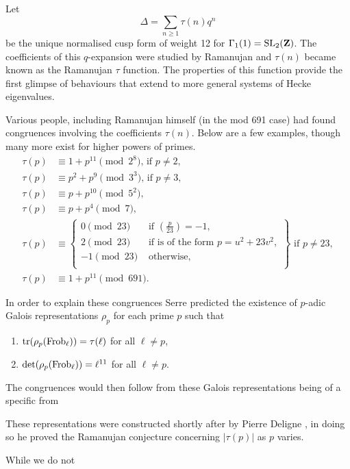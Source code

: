 \documentclass[a4paper,12pt]{article}
\begin{document}
\begin{ex}\label{ex:delt}
Let
\[
\Delta = \sum_{n \ge 1} \tau(n) q^n
\]
be the unique normalised cusp form of weight 12 for $\Gamma_1(1) = \operatorname{SL}_2(\mathbf{Z})$.
The coefficients of this $q$-expansion were studied by Ramanujan and $\tau(n)$ became known as the Ramanujan $\tau$ function.
The properties of this function provide the first glimpse of behaviours that extend to more general systems of Hecke eigenvalues.

Various people, including Ramanujan himself (in the mod 691 case) had found congruences involving the coefficients $\tau(n)$.
Below are a few examples, though many more exist for higher powers of primes.
\begin{align}\label{eq:taucong}
\tau(p) &\equiv 1 + p^{11} \pmod{2^8}\text{, if } p \ne 2,\\
\tau(p) &\equiv p^2 + p^9 \pmod{3^3}\text{, if } p \ne 3,\\
\tau(p) &\equiv p + p^{10} \pmod{5^2},\\
\tau(p) &\equiv p + p^4 \pmod{7},\\
\tau(p) &\equiv\left.\begin{cases}
0\pmod{23} & \text{ if } \left(\frac{p}{23}\right) = -1,\\
2\pmod{23} & \text{ if is of the form } p = u^2 + 23v^2,\\
-1\pmod{23} & \text{ otherwise},\\
\end{cases}\right\}\text{ if } p \ne 23,\\
\tau(p) &\equiv 1 + p^{11} \pmod{691}.
\end{align}

In order to explain these congruences Serre predicted \cite{Serre67} the existence of $p$-adic Galois representations $\rho_p$ for each prime $p$ such that
\begin{enumerate}
\item $\operatorname{tr}(\rho_p (\operatorname{Frob}_\ell)) = \tau(\ell)$ for all $\ell \ne p$,
\item $\det(\rho_p (\operatorname{Frob}_\ell)) = \ell^{11}$ for all $\ell \ne p$.
\end{enumerate}

The congruences would then follow from these Galois representations being of a specific from 

These representations were constructed shortly after by Pierre Deligne \cite{Deligne}, in doing so he proved the Ramanujan conjecture concerning $|\tau(p)|$ as $p$ varies.

While we do not 
\end{ex}
\end{document}
